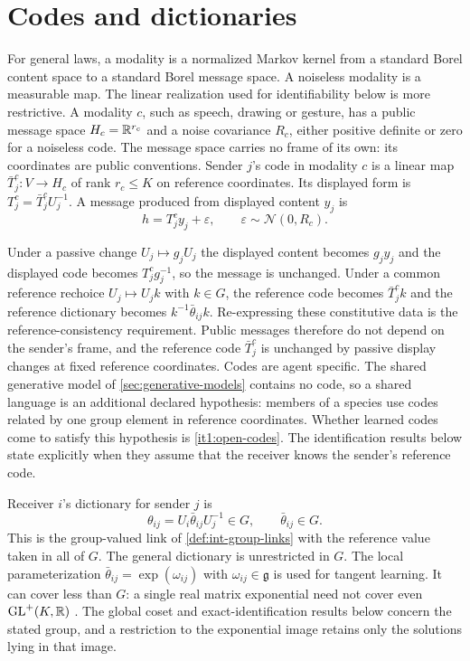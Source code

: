 \section{Codes and dictionaries}
\label{it1:ch-objects}

For general laws, a modality is a normalized Markov kernel from a standard Borel content space to a standard Borel message space. A noiseless modality is a measurable map. The linear realization used for identifiability below is more restrictive.
A modality $c$, such as speech, drawing or gesture, has a public message space $H_c=\mathbb R^{r_c}$ and a noise covariance $R_c$, either positive definite or zero for a noiseless code. The message space carries no frame of its own: its coordinates are public conventions. Sender $j$'s code in modality $c$ is a linear map $\bar T_j^c:V\to H_c$ of rank $r_c\leq K$ on reference coordinates. Its displayed form is $T_j^c=\bar T_j^cU_j^{-1}$. A message produced from displayed content $y_j$ is
\begin{equation}
h=T_j^cy_j+\varepsilon,\qquad\varepsilon\sim\mathcal N(0,R_c).
\label{it1:message}
\end{equation}

Under a passive change $U_j\mapsto g_jU_j$ the displayed content becomes $g_jy_j$ and the displayed code becomes $T_j^cg_j^{-1}$, so the message is unchanged. Under a common reference rechoice $U_j\mapsto U_jk$ with $k\in G$, the reference code becomes $\bar T_j^c k$ and the reference dictionary becomes $k^{-1}\bar\theta_{ij}k$. Re-expressing these constitutive data is the reference-consistency requirement. Public messages therefore do not depend on the sender's frame, and the reference code $\bar T_j^c$ is unchanged by passive display changes at fixed reference coordinates. Codes are agent specific. The shared generative model of \cref{sec:generative-models} contains no code, so a shared language is an additional declared hypothesis: members of a species use codes related by one group element in reference coordinates. Whether learned codes come to satisfy this hypothesis is \cref{it1:open-codes}. The identification results below state explicitly when they assume that the receiver knows the sender's reference code.

Receiver $i$'s dictionary for sender $j$ is
\begin{equation}
\theta_{ij}=U_i\bar\theta_{ij}U_j^{-1}\in G,\qquad
\bar\theta_{ij}\in G.
\label{it1:dictionary-eq}
\end{equation}
This is the group-valued link of \cref{def:int-group-links} with the reference value taken in all of $G$. The general dictionary is unrestricted in $G$. The local parameterization $\bar\theta_{ij}=\exp(\omega_{ij})$ with $\omega_{ij}\in\mathfrak g$ is used for tangent learning. It can cover less than $G$: a single real matrix exponential need not cover even $\mathrm{GL}^+(K,\mathbb R)$ \citep{Culver1966}. The global coset and exact-identification results below concern the stated group, and a restriction to the exponential image retains only the solutions lying in that image.

